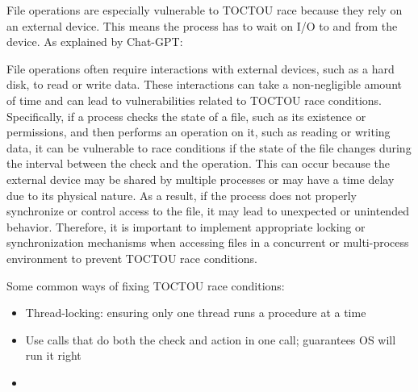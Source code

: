 \documentclass[code]{amznotes}
\begin{document}
File operations are especially vulnerable to TOCTOU race because they rely on an external device. This means the process has to wait on I/O to and from the device. As explained by Chat-GPT:

\begin{notebox}
    File operations often require interactions with external devices, such as a hard disk, to read or write data. These interactions can take a non-negligible amount of time and can lead to vulnerabilities related to TOCTOU race conditions. Specifically, if a process checks the state of a file, such as its existence or permissions, and then performs an operation on it, such as reading or writing data, it can be vulnerable to race conditions if the state of the file changes during the interval between the check and the operation. This can occur because the external device may be shared by multiple processes or may have a time delay due to its physical nature. As a result, if the process does not properly synchronize or control access to the file, it may lead to unexpected or unintended behavior. Therefore, it is important to implement appropriate locking or synchronization mechanisms when accessing files in a concurrent or multi-process environment to prevent TOCTOU race conditions.
\end{notebox}



Some common ways of fixing TOCTOU race conditions:
\begin{itemize}
    \item Thread-locking: ensuring only one thread runs a procedure at a time
    \item Use calls that do both the check and action in one call; guarantees OS will run it right
    \item {}
\end{itemize}
\end{document}
